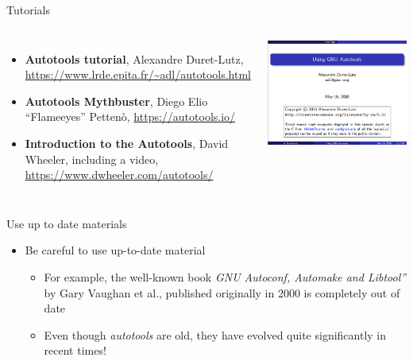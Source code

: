 \begin{frame}{Tutorials}
  \begin{columns}
    \begin{itemize}
    \item {\bf Autotools tutorial}, Alexandre Duret-Lutz,
      \url{https://www.lrde.epita.fr/~adl/autotools.html}
    \item {\bf Autotools Mythbuster}, Diego Elio “Flameeyes” Pettenò,
      \url{https://autotools.io/}
    \item {\bf Introduction to the Autotools}, David Wheeler, including
      a video, \url{https://www.dwheeler.com/autotools/}
    \end{itemize}
    \includegraphics[width=\textwidth]{slides/autotools-references/autotools-tutorial.png}
  \end{columns}
\end{frame}

\begin{frame}{Use up to date materials}
  \begin{itemize}
  \item Be careful to use up-to-date material
    \begin{itemize}
    \item For example, the well-known book {\em GNU Autoconf, Automake
        and Libtool”} by Gary Vaughan et al., published originally in
      2000 is completely out of date
    \item Even though {\em autotools} are old, they have evolved quite
      significantly in recent times!
    \end{itemize}
  \end{itemize}
\end{frame}
